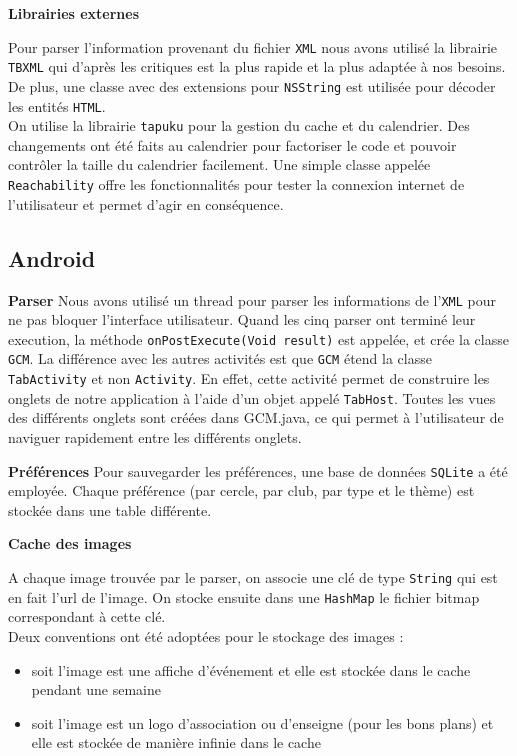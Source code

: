 \documentclass[a4paper, 11pt]{article}
\begin{document}
{\bf Librairies externes}

Pour parser l'information provenant du fichier \texttt{XML} nous avons utilisé la librairie \texttt{TBXML} qui d'après les critiques est la plus rapide et la plus adaptée à nos besoins. De plus, une classe avec des extensions pour \texttt{NSString} est utilisée pour décoder les entités \texttt{HTML}.\\
\indent On utilise la librairie \texttt{tapuku} pour la gestion du cache et du calendrier. Des changements ont été faits au calendrier pour factoriser le code et pouvoir contrôler la taille du calendrier facilement.
Une simple classe appelée \texttt{Reachability} offre les fonctionnalités pour tester la connexion internet de l'utilisateur et permet d'agir en conséquence.


\subsection{Android}
{\bf Parser}
Nous avons utilisé un thread pour parser les informations de l'\texttt{XML} pour ne pas bloquer l'interface utilisateur. Quand les cinq parser ont terminé leur execution, la méthode \texttt{onPostExecute(Void result)} est appelée, et crée la classe \texttt{GCM}. La différence avec les autres activités est que \texttt{GCM} étend la classe \texttt{TabActivity} et non \texttt{Activity}. En effet, cette activité permet de construire les onglets de notre application à l'aide d'un objet appelé \texttt{TabHost}. Toutes les vues des différents onglets sont créées dans GCM.java, ce qui permet à l'utilisateur de naviguer rapidement entre les différents onglets.


{\bf Préférences}
Pour sauvegarder les préférences, une base de données \texttt{SQLite} a été employée. Chaque préférence (par cercle, par club, par type et le thème) est stockée dans une table différente.
 
{\bf Cache des images}

A chaque image trouvée par le parser, on associe une clé de type \texttt{String} qui est en fait l'url de l'image. On stocke ensuite dans une \texttt{HashMap} le fichier bitmap correspondant à cette clé.\\
Deux conventions ont été adoptées pour le stockage des images :
\begin{itemize}
\item soit l'image est une affiche d'événement et elle est stockée dans le cache pendant une semaine
\item soit l'image est un logo d'association ou d'enseigne (pour les bons plans) et elle est stockée de manière infinie dans le cache\\
\end{itemize}
\end{document}
